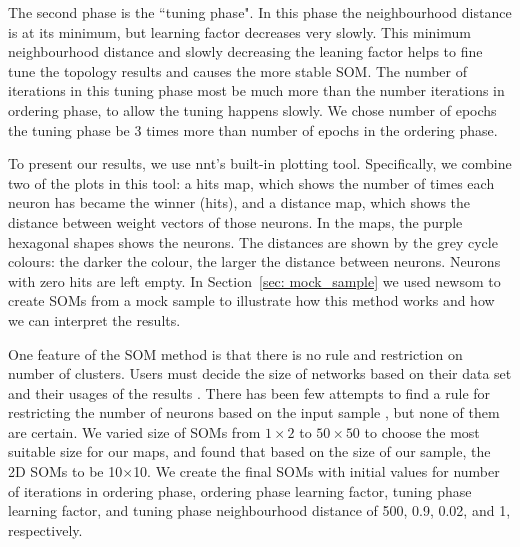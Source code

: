      The second phase is the ``tuning phase".
     In this phase the neighbourhood distance is at its minimum, but learning factor decreases very slowly.
     This minimum neighbourhood distance and slowly decreasing the leaning factor helps to fine tune the topology results and causes the more stable SOM. 
     The number of iterations in this tuning phase most be much more than the number iterations in ordering phase, to allow the tuning happens slowly. 
     We chose number of epochs the tuning phase be 3 times more than number of epochs in the ordering phase.
     
     To present our results, we use {\sc nnt}'s built-in plotting tool.
     Specifically, we combine two of the plots in this tool: a hits map, which shows the number of times each neuron has became the winner (hits), and a distance map, which shows the distance between weight vectors of those neurons.
     In the maps, the purple hexagonal shapes shows the neurons. 
     The distances are shown by the grey cycle colours: the darker the colour, the larger the distance between neurons.
     Neurons with zero hits are left empty.
     In Section~\ref{sec: mock_sample} we used {\sc newsom} to create SOMs from a mock sample to illustrate how this method works and how we can interpret the results.

     One feature of the SOM method is that there is no rule and restriction on number of clusters.
     Users must decide the size of networks based on their data set and their usages of the results .
     There has been few attempts to find a rule for restricting the number of neurons based on the input sample \citep[e.g.][]{Vesanto05}, but none of them are certain. 
     We varied size of SOMs from $1\times2$ to $50\times50$ to choose the most suitable size for our maps, and found that based on the size of our sample, the 2D SOMs to be 10$\times$10. 
     We create the final SOMs with initial values for number of iterations in ordering phase, ordering phase learning factor, tuning phase learning factor, and tuning phase neighbourhood distance of 500, 0.9, 0.02, and 1, respectively. 
     
